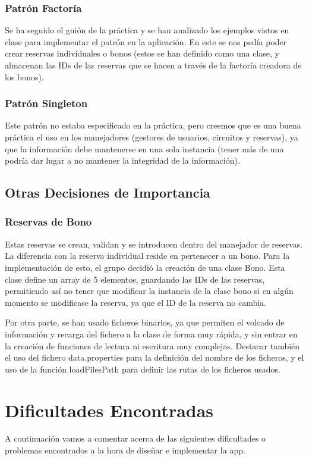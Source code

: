 \documentclass{article}
\begin{document}
	\subsubsection{Patrón Factoría}
	Se ha seguido el guión de la práctica y se han analizado los ejemplos vistos en clase para implementar el patrón en la aplicación. En este se nos pedía poder crear reservas individuales o bonos (estos se han definido como una clase, y almacenan las IDs de las reservas que se hacen a través de la factoría creadora de los bonos).
	
	\subsubsection{Patrón Singleton}
	Este patrón no estaba especificado en la práctica, pero creemos que es una buena práctica el uso en los manejadores (gestores de usuarios, circuitos y reservas), ya que la información debe mantenerse en una sola instancia (tener más de una podría dar lugar a no mantener la integridad de la información).
	
	\subsection{Otras Decisiones de Importancia}
	\subsubsection{Reservas de Bono}
	Estas reservas se crean, validan y se introducen dentro del manejador de reservas. La diferencia con la reserva individual reside en pertenecer a un bono. Para la implementación de esto, el grupo decidió la creación de una clase Bono. Esta clase define un array de 5 elementos, guardando las IDs de las reservas, permitiendo así no tener que modificar la instancia de la clase bono si en algún momento se modificase la reserva, ya que el ID de la reserva no cambia.
	
	Por otra parte, se han usado ficheros binarios, ya que permiten el volcado de información y recarga del fichero a la clase de forma muy rápida, y sin entrar en la creación de funciones de lectura ni escritura muy complejas. Destacar también el uso del fichero data.properties para la definición del nombre de los ficheros, y el uso de la función loadFilesPath para definir las rutas de los ficheros usados.
	
	\section{Dificultades Encontradas}
	A continuación vamos a comentar acerca de las siguientes dificultades o problemas encontrados a la hora de diseñar e implementar la app.
	
\end{document}
